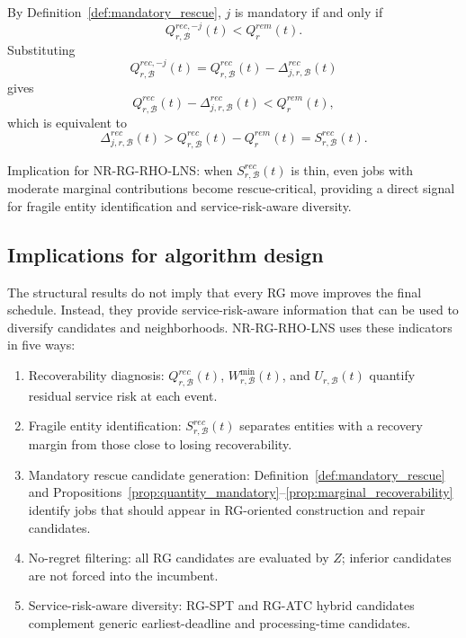 \documentclass[a4paper,fleqn]{cas-sc}
\begin{document}
\begin{pf}
By Definition~\ref{def:mandatory_rescue}, \(j\) is mandatory if and only if
\[
Q_{r,\mathcal B}^{rec,-j}(t)<Q_r^{rem}(t).
\]
Substituting
\[
Q_{r,\mathcal B}^{rec,-j}(t)
=
Q_{r,\mathcal B}^{rec}(t)
-
\Delta_{j,r,\mathcal B}^{rec}(t)
\]
gives
\[
Q_{r,\mathcal B}^{rec}(t)
-
\Delta_{j,r,\mathcal B}^{rec}(t)
<
Q_r^{rem}(t),
\]
which is equivalent to
\[
\Delta_{j,r,\mathcal B}^{rec}(t)
>
Q_{r,\mathcal B}^{rec}(t)-Q_r^{rem}(t)
=
S_{r,\mathcal B}^{rec}(t).
\]
\end{pf}

Implication for NR-RG-RHO-LNS: when \(S_{r,\mathcal B}^{rec}(t)\) is thin, even jobs with moderate marginal contributions become rescue-critical, providing a direct signal for fragile entity identification and service-risk-aware diversity.

\subsection{Implications for algorithm design}
\label{sec:recoverability_implications}

The structural results do not imply that every RG move improves the final schedule. Instead, they provide service-risk-aware information that can be used to diversify candidates and neighborhoods. NR-RG-RHO-LNS uses these indicators in five ways:
\begin{enumerate}
    \item Recoverability diagnosis: \(Q_{r,\mathcal B}^{rec}(t)\), \(W_{r,\mathcal B}^{\min}(t)\), and \(U_{r,\mathcal B}(t)\) quantify residual service risk at each event.
    \item Fragile entity identification: \(S_{r,\mathcal B}^{rec}(t)\) separates entities with a recovery margin from those close to losing recoverability.
    \item Mandatory rescue candidate generation: Definition~\ref{def:mandatory_rescue} and Propositions~\ref{prop:quantity_mandatory}--\ref{prop:marginal_recoverability} identify jobs that should appear in RG-oriented construction and repair candidates.
    \item No-regret filtering: all RG candidates are evaluated by \(Z\); inferior candidates are not forced into the incumbent.
    \item Service-risk-aware diversity: RG-SPT and RG-ATC hybrid candidates complement generic earliest-deadline and processing-time candidates.
\end{enumerate}
\end{document}
